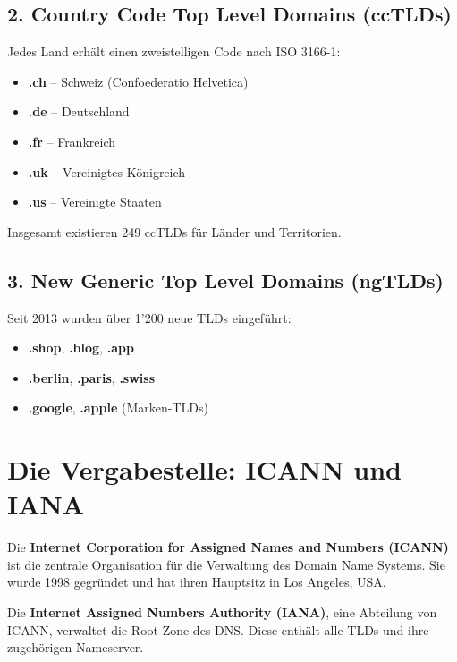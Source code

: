 \documentclass[
  nswissgerman,
  a4paper,
  DIV=11,
  numbers=noendperiod,
  ngerman]{scrreprt}
\providecommand{\tightlist}{%
  \setlength{\itemsep}{0pt}\setlength{\parskip}{0pt}}
\begin{document}
\subsection{2. Country Code Top Level Domains
(ccTLDs)}\label{country-code-top-level-domains-cctlds}

Jedes Land erhält einen zweistelligen Code nach ISO 3166-1:

\begin{itemize}
\tightlist
\item
  \textbf{.ch} -- Schweiz (Confoederatio Helvetica)
\item
  \textbf{.de} -- Deutschland
\item
  \textbf{.fr} -- Frankreich
\item
  \textbf{.uk} -- Vereinigtes Königreich
\item
  \textbf{.us} -- Vereinigte Staaten
\end{itemize}

Insgesamt existieren 249 ccTLDs für Länder und Territorien.

\subsection{3. New Generic Top Level Domains
(ngTLDs)}\label{new-generic-top-level-domains-ngtlds}

Seit 2013 wurden über 1'200 neue TLDs eingeführt:

\begin{itemize}
\tightlist
\item
  \textbf{.shop}, \textbf{.blog}, \textbf{.app}
\item
  \textbf{.berlin}, \textbf{.paris}, \textbf{.swiss}
\item
  \textbf{.google}, \textbf{.apple} (Marken-TLDs)
\end{itemize}

\section{Die Vergabestelle: ICANN und
IANA}\label{die-vergabestelle-icann-und-iana}

Die \textbf{Internet Corporation for Assigned Names and Numbers (ICANN)}
ist die zentrale Organisation für die Verwaltung des Domain Name
Systems. Sie wurde 1998 gegründet und hat ihren Hauptsitz in Los
Angeles, USA.

Die \textbf{Internet Assigned Numbers Authority (IANA)}, eine Abteilung
von ICANN, verwaltet die Root Zone des DNS. Diese enthält alle TLDs und
ihre zugehörigen Nameserver.
\end{document}
